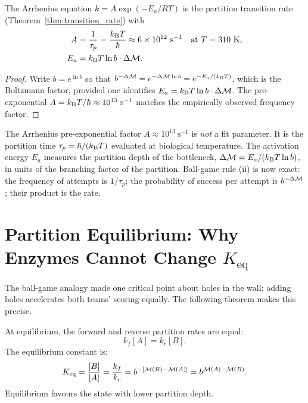 \begin{corollary}
\label{cor:arrhenius}
The Arrhenius equation $k = A \exp(-E_a / RT)$ is the partition transition
rate (Theorem~\ref{thm:transition_rate}) with
\begin{align}
  A &= \frac{1}{\tau_p} = \frac{k_{\mathrm{B}} T}{\hbar} \approx 6 \times 10^{12}\ \mathrm{s}^{-1}
      \quad \text{at } T = 310\ \mathrm{K}, \label{eq:arrhenius_A}\\
  E_a &= k_{\mathrm{B}} T \ln b \cdot \Delta\mathcal{M}. \label{eq:arrhenius_Ea}
\end{align}
\end{corollary}

\begin{proof}
Write $b = e^{\ln b}$ so that
$b^{-\Delta\mathcal{M}} = e^{-\Delta\mathcal{M} \ln b} = e^{-E_a/(k_{\mathrm{B}} T)}$,
which is the Boltzmann factor, provided one identifies
$E_a = k_{\mathrm{B}} T \ln b \cdot \Delta\mathcal{M}$.
The pre-exponential $A = \kB T/\hbar \approx 10^{13}\ \mathrm{s}^{-1}$
matches the empirically observed frequency factor.
\end{proof}

\begin{keyresult}
The Arrhenius pre-exponential factor $A \approx 10^{13}\ \mathrm{s}^{-1}$
is \emph{not} a fit parameter. It is the partition time $\tau_p = \hbar/(k_{\mathrm{B}} T)$
evaluated at biological temperature. The activation energy $E_a$ measures
the partition depth of the bottleneck, $\Delta\mathcal{M} = E_a / (k_{\mathrm{B}} T \ln b)$,
in units of the branching factor of the partition. Ball-game rule (ii) is
now exact: the frequency of attempts is $1/\tau_p$; the probability of
success per attempt is $b^{-\Delta\mathcal{M}}$; their product is the rate.
\end{keyresult}

\section{Partition Equilibrium: Why Enzymes Cannot Change $K_{\mathrm{eq}}$}
\label{sec:partition_equilibrium}

The ball-game analogy made one critical point about holes in the wall: adding
holes accelerates both teams' scoring equally. The following theorem makes this
precise.

\begin{theorem}
\label{thm:partition_equilibrium}
At equilibrium, the forward and reverse partition rates are equal:
\begin{equation}
  k_f [A] = k_r [B].
  \label{eq:detailed_balance}
\end{equation}
The equilibrium constant is:
\begin{equation}
  K_{\mathrm{eq}} = \frac{[B]}{[A]} = \frac{k_f}{k_r}
    = b^{-[\mathcal{M}(B) - \mathcal{M}(A)]} = b^{\mathcal{M}(A) - \mathcal{M}(B)}.
  \label{eq:keq_partition}
\end{equation}
Equilibrium favours the state with lower partition depth.
\end{theorem}

